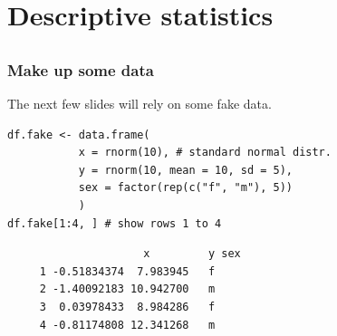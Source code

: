 \documentclass[bigger]{beamer}
\begin{document}
\section{Descriptive statistics}
\label{sec-5}
\subsection{}
\begin{frame}[fragile]
\frametitle{Make up some data}
\label{sec-5-1-1}

    The next few slides will rely on some fake data. 

\lstset{language=R}
\begin{lstlisting}
df.fake <- data.frame(
           x = rnorm(10), # standard normal distr.
           y = rnorm(10, mean = 10, sd = 5),
           sex = factor(rep(c("f", "m"), 5))
           )
df.fake[1:4, ] # show rows 1 to 4
\end{lstlisting}

\begin{verbatim}
                     x         y sex
     1 -0.51834374  7.983945   f
     2 -1.40092183 10.942700   m
     3  0.03978433  8.984286   f
     4 -0.81174808 12.341268   m
\end{verbatim}
\end{frame}
\end{document}

